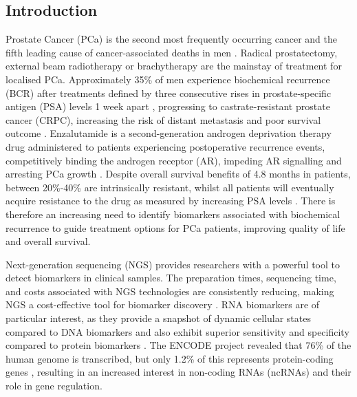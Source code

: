\subsection{Introduction}\label{sec1}
Prostate Cancer (PCa) is the second most frequently occurring cancer and the fifth leading cause of cancer-associated deaths in men \cite{Sung2021}. Radical prostatectomy, external beam radiotherapy or brachytherapy are the mainstay of treatment for localised PCa. Approximately 35\% of men experience biochemical recurrence (BCR) after treatments defined by three consecutive rises in prostate-specific antigen (PSA) levels 1 week apart \cite{Rans2022}, progressing to castrate-resistant prostate cancer (CRPC), increasing the risk of distant metastasis and poor survival outcome \cite{Shore2024}. Enzalutamide is a second-generation androgen deprivation therapy drug administered to patients experiencing postoperative recurrence events, competitively binding the androgen receptor (AR), impeding AR signalling and arresting PCa growth \cite{Koochekpour2010}. Despite overall survival benefits of 4.8 months in patients, between 20\%-40\% are intrinsically resistant, whilst all patients will eventually acquire resistance to the drug as measured by increasing PSA levels \cite{Scher2012Sep, Cornford2017}. There is therefore an increasing need to identify biomarkers associated with biochemical recurrence to guide treatment options for PCa patients, improving quality of life and overall survival.

Next-generation sequencing (NGS) provides researchers with a powerful tool to detect biomarkers in clinical samples. The preparation times, sequencing time, and costs associated with NGS technologies are consistently reducing, making NGS a cost-effective tool for biomarker discovery \cite{Lopez2015}. RNA biomarkers are of particular interest, as they provide a snapshot of dynamic cellular states compared to DNA biomarkers and also exhibit superior sensitivity and specificity compared to protein biomarkers \cite{Nimse2016, Xi2017}. The ENCODE project revealed that 76\% of the human genome is transcribed, but only 1.2\% of this represents protein-coding genes \cite{Consortium2012, Djebali2012}, resulting in an increased interest in non-coding RNAs (ncRNAs) and their role in gene regulation. 


